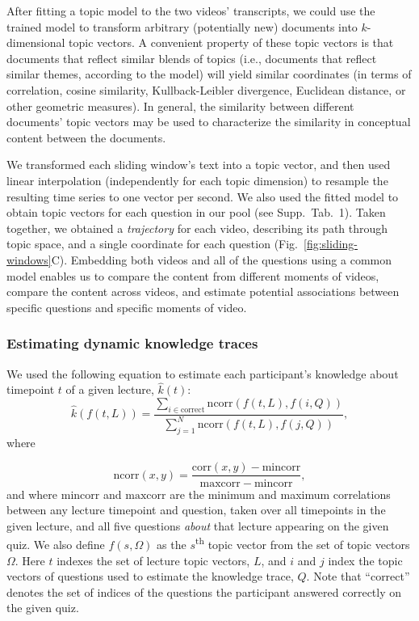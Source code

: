 \documentclass[10pt]{article}
\newcommand{\questions}{1}
\begin{document}
After fitting a topic model to the two videos' transcripts, we could use the
trained model to transform arbitrary (potentially new) documents into
$k$-dimensional topic vectors. A convenient property of these topic vectors is
that documents that reflect similar blends of topics (i.e., documents that
reflect similar themes, according to the model) will yield similar coordinates
(in terms of correlation, cosine similarity, Kullback-Leibler divergence,
Euclidean distance, or other geometric measures). In general, the similarity
between different documents' topic vectors may be used to characterize the
similarity in conceptual content between the documents.

We transformed each sliding window's text into a topic vector, and then used
linear interpolation (independently for each topic dimension) to resample the
resulting time series to one vector per second. We also used the fitted model to
obtain topic vectors for each question in our pool (see Supp.~Tab.~\questions).
Taken together, we obtained a \textit{trajectory} for each video, describing
its path through topic space, and a single coordinate for each question
(Fig.~\ref{fig:sliding-windows}C). Embedding both videos and all of the
questions using a common model enables us to compare the content from different
moments of videos, compare the content across videos, and estimate potential
associations between specific questions and specific moments of video.


\subsubsection*{Estimating dynamic knowledge traces}\label{subsec:traces}

We used the following equation to estimate each participant's knowledge about
timepoint $t$ of a given lecture, $\hat{k}(t)$:
\begin{equation}
    \hat{k}\left(f(t, L)\right) = \frac{\sum_{i \in \mathrm{correct}}\mathrm{ncorr}\left(f(t, L), f(i, Q)\right)}{\sum_{j = 1}^N \mathrm{ncorr}\left(f(t, L), f(j, Q)\right)},
    \label{eqn:prop}
\end{equation}
where

\begin{equation}
    \mathrm{ncorr}(x, y) = \frac{\mathrm{corr}(x, y) - \mathrm{mincorr}}{\mathrm{maxcorr} - \mathrm{mincorr}},
\end{equation}
and where $\mathrm{mincorr}$ and $\mathrm{maxcorr}$ are the minimum and maximum
correlations between any lecture timepoint and question, taken over all
timepoints in the given lecture, and all five questions \textit{about} that lecture appearing on the given quiz.
We also define $f(s, \Omega)$ as the
$s$\textsuperscript{th} topic vector from the set of topic vectors $\Omega$.
Here $t$ indexes the set of lecture topic vectors, $L$, and $i$ and $j$ index
the topic vectors of questions used to estimate the knowledge trace, $Q$. Note
that ``correct'' denotes the set of indices of the questions the participant
answered correctly on the given quiz.
\end{document}
